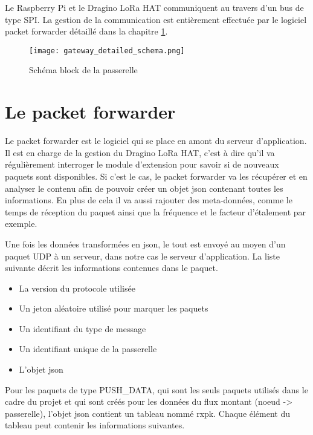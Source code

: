 Le Raspberry Pi et le Dragino LoRa HAT communiquent au travers d'un bus de type SPI. La gestion de la communication est entièrement effectuée par le logiciel packet forwarder détaillé dans la chapitre \ref{ch:packet_forwarder}.

\begin{figure}[htb]
\centering 
\texttt{[image: gateway\_detailed\_schema.png]} 
\caption{Schéma block de la passerelle}
\label{fig:gateway_schema}
\end{figure}


\section{Le packet forwarder}\label{ch:packet_forwarder}

Le packet forwarder est le logiciel qui se place en amont du serveur d'application. Il est en charge de la gestion du Dragino LoRa HAT, c'est à dire qu'il va régulièrement interroger le module d'extension pour savoir si de nouveaux paquets sont disponibles. Si c'est le cas, le packet forwarder va les récupérer et en analyser le contenu afin de pouvoir créer un objet json contenant toutes les informations. En plus de cela il va aussi rajouter des meta-données, comme le temps de réception du paquet ainsi que la fréquence et le facteur d'étalement par exemple.

Une fois les données transformées en json, le tout est envoyé au moyen d'un paquet UDP à un serveur, dans notre cas le serveur d'application. La liste suivante décrit les informations contenues dans le paquet.

\begin{itemize}
\item La version du protocole utilisée
\item Un jeton aléatoire utilisé pour marquer les paquets
\item Un identifiant du type de message
\item Un identifiant unique de la passerelle
\item L'objet json
\end{itemize}

Pour les paquets de type PUSH\_DATA, qui sont les seuls paquets utilisés dans le cadre du projet et qui sont créés pour les données du flux montant (noeud -> passerelle), l'objet json contient un tableau nommé rxpk. Chaque élément du tableau peut contenir les informations suivantes.

